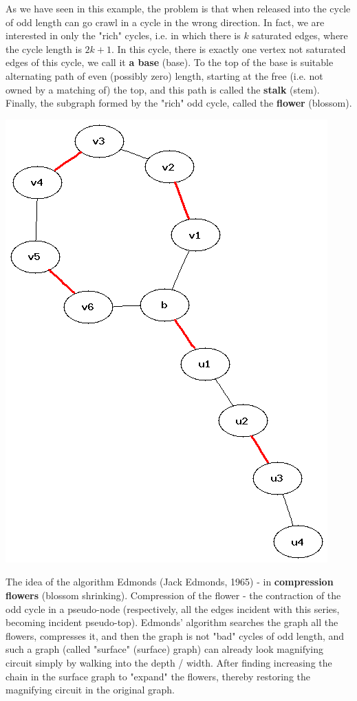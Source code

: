 As we have seen in this example, the problem is that when released into the cycle of odd length can go crawl in a cycle in the wrong direction. In fact, we are interested in only the "rich" cycles, i.e. in which there is $k$ saturated edges, where the cycle length is $2k +1$. In this cycle, there is exactly one vertex not saturated edges of this cycle, we call it \textbf{a base} (base). To the top of the base is suitable alternating path of even (possibly zero) length, starting at the free (i.e. not owned by a matching of) the top, and this path is called the \textbf{stalk} (stem). Finally, the subgraph formed by the "rich" odd cycle, called the \textbf{flower} (blossom).

\includegraphics[scale=0.35]{4.png}

The idea of the algorithm Edmonds (Jack Edmonds, 1965) - in \textbf{compression flowers} (blossom shrinking). Compression of the flower - the contraction of the odd cycle in a pseudo-node (respectively, all the edges incident with this series, becoming incident pseudo-top). Edmonds' algorithm searches the graph all the flowers, compresses it, and then the graph is not "bad" cycles of odd length, and such a graph (called "surface" (surface) graph) can already look magnifying circuit simply by walking into the depth / width. After finding increasing the chain in the surface graph to "expand" the flowers, thereby restoring the magnifying circuit in the original graph.

